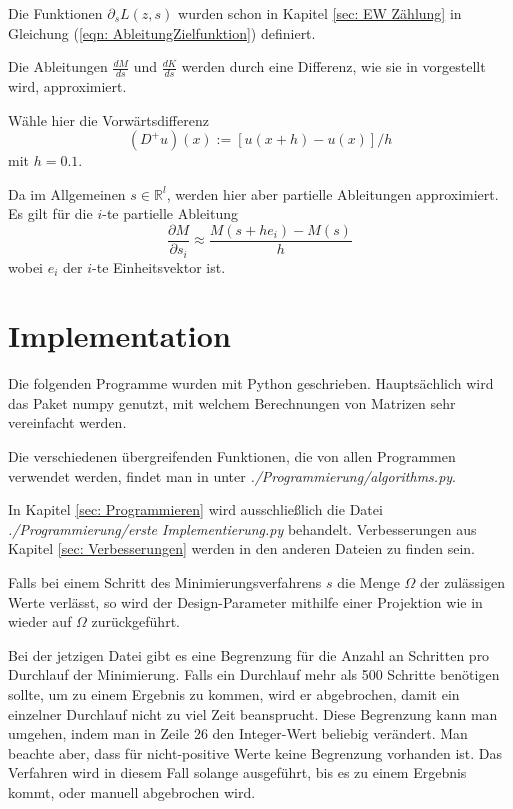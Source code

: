 \documentclass[a4paper,12pt]{report}
\newcommand{\R}{\mathbb R}
\newcommand{\zitat}[1]{\glqq #1\grqq}
\newcommand{\1}{\mathds{1}}
\theoremstyle{plain} %
\theoremstyle{definition} %
\theoremstyle{remark}
\begin{document}
            Die Funktionen $\partial_s L(z, s)$ wurden schon in Kapitel \ref{sec: EW Zählung} in Gleichung (\ref{eqn: AbleitungZielfunktion}) definiert.

            Die Ableitungen $\frac{d M}{d s}$ und $\frac{d K}{d s}$ werden durch eine Differenz, wie sie in \cite[S. 16 f.]{numerikGrossmann} vorgestellt wird, approximiert.

            Wähle hier die Vorwärtsdifferenz
            \begin{equation}
                  \label{def: DiffVerfahren}
                  (D^+u)(x):=[u(x+h)-u(x)]/h
            \end{equation}
            mit $h=0.1$.

            Da im Allgemeinen $s\in \R^l$, werden hier aber partielle Ableitungen approximiert.
            Es gilt für die $i$-te partielle Ableitung
            $$\frac{\partial M}{\partial s_i}\approx \frac{M(s+h e_i)-M(s)}{h}$$
            wobei $e_i$ der $i$-te Einheitsvektor ist.
 
      \section{Implementation}
            Die folgenden Programme wurden mit Python geschrieben. Hauptsächlich wird das Paket \zitat{numpy} genutzt,
            mit welchem Berechnungen von Matrizen sehr vereinfacht werden.

            Die verschiedenen übergreifenden Funktionen, die von allen Programmen verwendet werden, findet man in \cite{github}
            unter {\textit{./Programmierung/algorithms.py}}.

            In Kapitel \ref{sec: Programmieren} wird ausschließlich die Datei {\textit{./Programmierung/erste Implementierung.py}} behandelt.
            Verbesserungen aus Kapitel \ref{sec: Verbesserungen} werden in den anderen Dateien zu finden sein.
            
            Falls bei einem Schritt des Minimierungsverfahrens $s$ die Menge $\Omega$ der zulässigen Werte verlässt,
            so wird der Design-Parameter mithilfe einer Projektion wie in \cite[S. 314]{optimierungJarreProjektion} wieder auf $\Omega$ zurückgeführt.
            
            Bei der jetzigen Datei gibt es eine Begrenzung für die Anzahl an Schritten pro Durchlauf der Minimierung.
            Falls ein Durchlauf mehr als 500 Schritte benötigen sollte, um zu einem Ergebnis zu kommen, wird er abgebrochen, damit ein einzelner Durchlauf nicht zu viel Zeit beansprucht.
            Diese Begrenzung kann man umgehen, indem man in Zeile 26 den Integer-Wert beliebig verändert. Man beachte aber, dass für nicht-positive Werte keine Begrenzung vorhanden ist.
            Das Verfahren wird in diesem Fall solange ausgeführt, bis es zu einem Ergebnis kommt, oder manuell abgebrochen wird.
\end{document}
